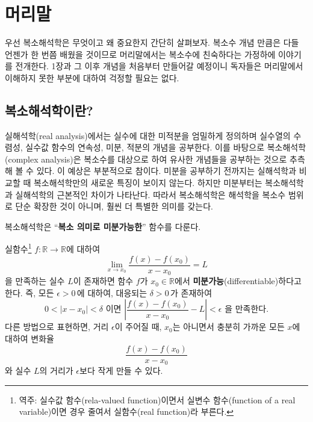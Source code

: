 \chapter*[머리말]{머리말}




우선 복소해석학은 무엇이고 왜 중요한지 간단히 살펴보자.
복소수 개념 만큼은 다들 언젠가 한 번쯤 배웠을 것이므로 
머리말에서는 복소수에 친숙하다는 가정하에 이야기를 전개한다.
1장과 그 이후 개념을 처음부터 만들어갈 예정이니
독자들은 머리말에서 이해하지 못한 부분에 대하여 걱정할 필요는 없다.

\section*{복소해석학이란?}
실해석학(real analysis)에서는 실수에 대한 미적분을 엄밀하게 정의하며
실수열의 수렴성, 실수값 함수의 연속성, 미분, 적분의 개념을 공부한다.
이를 바탕으로 복소해석학(complex analysis)은
복소수를 대상으로 하여 유사한 개념들을 공부하는 것으로 추측해 볼 수 있다.
이 예상은 부분적으로 참이다.
미분을 공부하기 전까지는 실해석학과 비교할 때 복소해석학만의
새로운 특징이 보이지 않는다.
하지만 미분부터는 복소해석학과 실해석학의 근본적인 차이가 나타난다.
따라서 복소해석학은 해석학을 복소수 범위로 단순 확장한 것이 아니며, 훨씬 더 특별한 의미를 갖는다.

\begin{salt_tcb_line}
\begin{center} 
복소해석학은 ``{\bf 복소 의미로 미분가능한}'' 함수를 다룬다.
\end{center}
\end{salt_tcb_line}

실함수\footnote{
역주:
실수값 함수(rela-valued function)이면서 실변수 함수(function of a real variable)이면 경우 줄여서
실함수(real function)라 부른다.
}
 $f:\mathbb R \to \mathbb R$에 대하여
$$
\lim_{x\to x_0} \frac{f(x)-f(x_0)}{x-x_0} = L
$$
을 만족하는 실수 $L$이 존재하면 
함수 $f$가 $x_0\in \mathbb R$에서 {\bf 미분가능}(differentiable)하다고 한다.
즉, 모든 $\epsilon>0\,$에 대하여,  대응되는 $\delta>0\,$가 존재하여
$$
0<|x-x_0|<\delta \text{ 이면 }
\left| \frac{f(x)-f(x_0)}{x-x_0} - L\right| < \epsilon \text{ 을 만족한다.}
$$
다른 방법으로 표현하면, 
거리 $\epsilon$이 주어질 때,
$x_0$는 아니면서 충분히 가까운 모든 $x$에 대하여 변화율
$$
 \frac{f(x)-f(x_0)}{x-x_0}
$$
와 실수 $L$의 거리가 $\epsilon$보다 작게 만들 수 있다.

